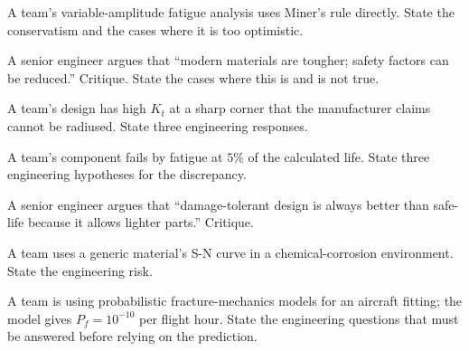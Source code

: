 \begin{exercise}
A team's variable-amplitude fatigue analysis uses Miner's rule directly. State the conservatism and the cases where it is too optimistic.
\end{exercise}

\begin{exercise}
A senior engineer argues that ``modern materials are tougher; safety factors can be reduced.'' Critique. State the cases where this is and is not true.
\end{exercise}

\begin{exercise}
A team's design has high $K_t$ at a sharp corner that the manufacturer claims cannot be radiused. State three engineering responses.
\end{exercise}

\begin{exercise}
A team's component fails by fatigue at $5\%$ of the calculated life. State three engineering hypotheses for the discrepancy.
\end{exercise}

\begin{exercise}
A senior engineer argues that ``damage-tolerant design is always better than safe-life because it allows lighter parts.'' Critique.
\end{exercise}

\begin{exercise}
A team uses a generic material's S-N curve in a chemical-corrosion environment. State the engineering risk.
\end{exercise}

\begin{exercise}
A team is using probabilistic fracture-mechanics models for an aircraft fitting; the model gives $P_f = 10^{-10}$ per flight hour. State the engineering questions that must be answered before relying on the prediction.
\end{exercise}
